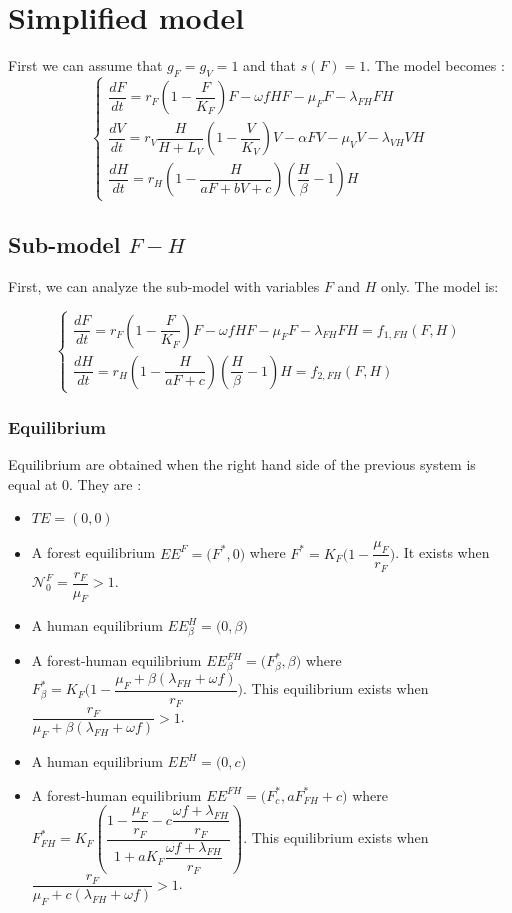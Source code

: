 \documentclass{article}
\newcommand{\lf}{\lambda_{FH}}
\newcommand{\lv}{\lambda_{VH}}
\newcommand{\NF}{\mathcal{N}_0^F}
\begin{document}
\section{Simplified model}
First we can assume that $g_F = g_V = 1$ and that $s(F) = 1$. The model becomes :
\begin{equation}    
\left\{ \begin{array}{l}
\dfrac{dF}{dt}=r_{F}\left(1-\dfrac{F}{K_{F}}\right)F-\omega f H F - \mu_F F -\lf F H \\
\dfrac{dV}{dt}=r_V \dfrac{H}{H + L_V} \left(1-\dfrac{V}{K_{V}}\right)V -\alpha FV-\mu_V V -\lv V H\\
\dfrac{dH}{dt}=r_H \left(1-\dfrac{H}{aF + bV + c} \right)  (\dfrac{H}{\beta} - 1) H
\end{array}\right.
\label{model:simplified}
\end{equation}

\subsection{Sub-model $F-H$}
First, we can analyze the sub-model with variables $F$ and $H$ only. The model is:

\begin{equation}    
\left\{ \begin{array}{l}
\dfrac{dF}{dt}=r_{F}\left(1-\dfrac{F}{K_{F}}\right)F-\omega f H F - \mu_F F -\lf F H = f_{1, FH} (F,H) \\
\dfrac{dH}{dt}=r_H \left(1-\dfrac{H}{aF + c} \right)  (\dfrac{H}{\beta} - 1) H = f_{2,FH}(F,H)
\end{array}\right.
\label{model:submodelFH}
\end{equation}

\subsubsection{Equilibrium}
Equilibrium are obtained when the right hand side of the previous system is equal at 0. They are :
\begin{itemize}
\item $TE = (0,0)$
\item A forest equilibrium $EE^F = \Big(F^*, 0 \Big) $ where $F^* = K_F \Big(1 - \dfrac{\mu_F}{r_F}\Big)$. It exists when $\NF = \dfrac{r_F}{\mu_F} > 1$.
\item A human equilibrium $EE^H_\beta = \Big(0,\beta \Big)$
\item A forest-human equilibrium $EE^{FH}_\beta = \Big(F^*_\beta, \beta\Big)$ where $F^*_\beta = K_F \Big(1-\dfrac{\mu_F + \beta(\lf + \omega f)}{r_F} \Big)$.
This equilibrium exists when $\dfrac{r_F}{\mu_F + \beta(\lf + \omega f)} > 1$.
\item A human equilibrium $EE^H = \Big(0,c \Big)$
\item A forest-human equilibrium $EE^{FH} = \Big(F^*_{c}, aF^*_{FH} + c \Big)$ where $F^*_{FH} = K_F \left( \dfrac{1 - \dfrac{\mu_F}{r_F} - c \dfrac{\omega f + \lf}{r_F}}{1 + a K_F \dfrac{\omega f + \lf}{r_F}} \right)$. This equilibrium exists when $\dfrac{r_F}{\mu_F + c(\lf + \omega f)} > 1$.
\end{itemize}
\end{document}

